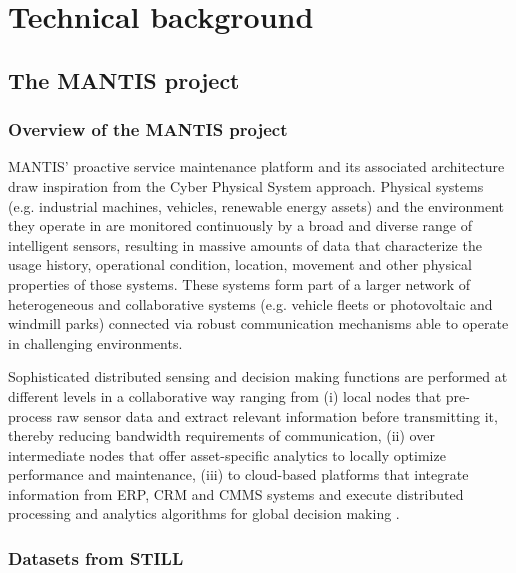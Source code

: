 \chapter{Technical background}
	\section{The MANTIS project}
		\subsection{Overview of the MANTIS project}
MANTIS' proactive service maintenance platform and its associated architecture draw inspiration from the Cyber Physical System approach. Physical systems (e.g. industrial machines, vehicles, renewable energy assets) and the environment they operate in are monitored continuously by a broad and diverse range of intelligent sensors, resulting in massive amounts of data that characterize the usage history, operational condition, location, movement and other physical properties of those systems. These systems form part of a larger network of heterogeneous and collaborative systems (e.g. vehicle fleets or photovoltaic and windmill parks) connected via robust communication mechanisms able to operate in challenging environments.

Sophisticated distributed sensing and decision making functions are performed at different levels in a collaborative way ranging from (i) local nodes that pre-process raw sensor data and extract relevant information before transmitting it, thereby reducing bandwidth requirements of communication, (ii) over intermediate nodes that offer asset-specific analytics to locally optimize performance and maintenance, (iii) to cloud-based platforms that integrate information from ERP, CRM and CMMS systems and execute distributed processing and analytics algorithms for global decision making \cite{Mantis}.
\clearpage
		\subsection{Datasets from STILL}
